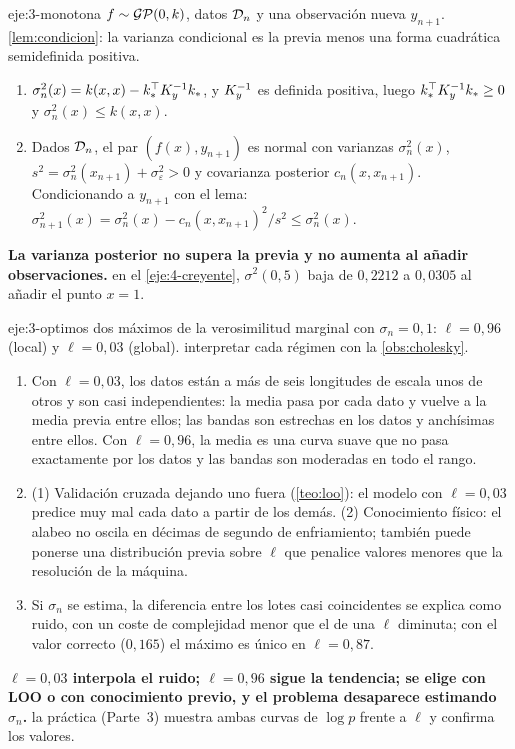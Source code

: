 \begin{solucion}{eje:3-monotona}
\datos $f\sim\mathcal{GP}(0,k)$, datos $\mathcal{D}_n$ y una observación nueva $y_{n+1}$.
\planteamiento \cref{lem:condicion}: la varianza condicional es la previa menos una forma cuadrática semidefinida positiva.
\pasos
\begin{enumerate}[label=(\alph*)]
  \item $\sigma_n^2(x)=k(x,x)-k_*^\top K_{y}^{-1}k_*$, y $K_{y}^{-1}$ es definida positiva, luego $k_*^\top K_{y}^{-1}k_*\ge0$ y $\sigma_n^2(x)\le k(x,x)$.
  \item Dados $\mathcal{D}_n$, el par $(f(x),y_{n+1})$ es normal con varianzas $\sigma_n^2(x)$, $s^2=\sigma_n^2(x_{n+1})+\sigma_\varepsilon^2>0$ y covarianza posterior $c_n(x,x_{n+1})$. Condicionando a $y_{n+1}$ con el lema: $\sigma_{n+1}^2(x)=\sigma_n^2(x)-c_n(x,x_{n+1})^2/s^2\le\sigma_n^2(x)$.
\end{enumerate}
\resultado \textbf{La varianza posterior no supera la previa y no aumenta al añadir observaciones.}
\comprobacion en el \cref{eje:4-creyente}, $\sigma^2(0{,}5)$ baja de $0{,}2212$ a $0{,}0305$ al añadir el punto $x=1$.
\end{solucion}

\begin{solucion}{eje:3-optimos}
\datos dos máximos de la verosimilitud marginal con $\sigma_n=0{,}1$: $\ell=0{,}96$ (local) y $\ell=0{,}03$ (global).
\planteamiento interpretar cada régimen con la \cref{obs:cholesky}.
\pasos
\begin{enumerate}[label=(\alph*)]
  \item Con $\ell=0{,}03$, los datos están a más de seis longitudes de escala unos de otros y son casi independientes: la media pasa por cada dato y vuelve a la media previa entre ellos; las bandas son estrechas en los datos y anchísimas entre ellos. Con $\ell=0{,}96$, la media es una curva suave que no pasa exactamente por los datos y las bandas son moderadas en todo el rango.
  \item (1) Validación cruzada dejando uno fuera (\cref{teo:loo}): el modelo con $\ell=0{,}03$ predice muy mal cada dato a partir de los demás. (2) Conocimiento físico: el alabeo no oscila en décimas de segundo de enfriamiento; también puede ponerse una distribución previa sobre $\ell$ que penalice valores menores que la resolución de la máquina.
  \item Si $\sigma_n$ se estima, la diferencia entre los lotes casi coincidentes se explica como ruido, con un coste de complejidad menor que el de una $\ell$ diminuta; con el valor correcto ($0{,}165$) el máximo es único en $\ell=0{,}87$.
\end{enumerate}
\resultado \textbf{$\ell=0{,}03$ interpola el ruido; $\ell=0{,}96$ sigue la tendencia; se elige con LOO o con conocimiento previo, y el problema desaparece estimando $\sigma_n$.}
\comprobacion la práctica (Parte~3) muestra ambas curvas de $\log p$ frente a $\ell$ y confirma los valores.
\end{solucion}


